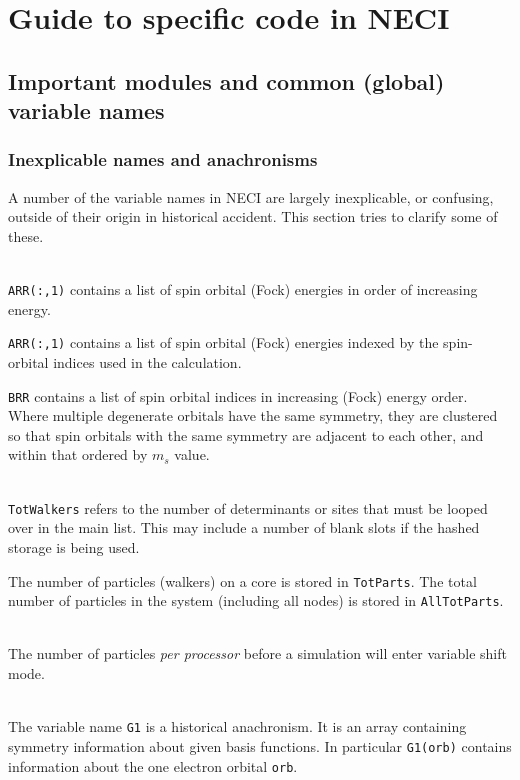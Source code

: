 \documentclass[a4paper,notitlepage,dvipsnames]{scrreprt}
\newcommand\headitem[1]{\needspace{1.5\baselineskip}\item[{\boldmath #1 \nopagebreak}] \hfill \\ \nopagebreak}
\let\code\lstinline
\begin{document}
{{{%

\chapter{Guide to specific code in NECI}

\section{Important modules and common (global) variable names}
\label{sect:cons-types}

\subsection{Inexplicable names and anachronisms}
	A number of the variable names in NECI are largely inexplicable, or
	confusing, outside of their origin in historical accident. This section
	tries to clarify some of these.

	\begin{description}
		\headitem{ARR, BRR}
			\code{ARR(:,1)} contains a list of spin orbital (Fock)
			energies in	order of increasing energy.

			\code{ARR(:,1)} contains a list of spin orbital (Fock)
			energies indexed by the spin-orbital indices used in the
			calculation.

			\code{BRR} contains a list of spin orbital indices in
			increasing (Fock) energy order. Where multiple degenerate orbitals
			have the same symmetry, they are clustered so that spin orbitals
			with the same symmetry are adjacent to each other, and within that
			ordered by $m_s$ value.

		\headitem{TotWalkers and TotParts}
			\code{TotWalkers} refers to the number of determinants or
			sites that must be looped over in the main list. This may include
			a number of blank slots if the hashed storage is being used.

			The number of particles (walkers) on a core is stored in
			\code{TotParts}. The total number of particles in the system
			(including all nodes) is stored in \code{AllTotParts}.

		\headitem{InitWalkers}
			The number of particles \emph{per processor} before a simulation
			will enter variable shift mode.

		\headitem{G1}
			The variable name \code{G1} is a historical anachronism. It
			is an array containing symmetry information about given basis
			functions. In particular \code{G1(orb)} contains information
			about the one electron orbital \code{orb}.


\end{description}}}}
\end{document}
